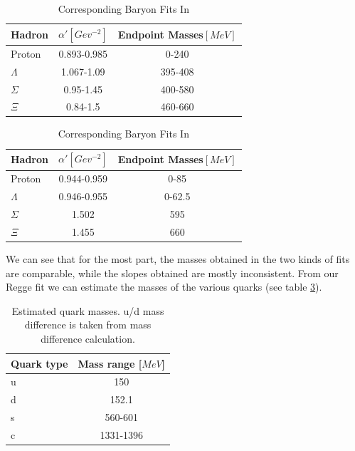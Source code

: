 \documentclass[11pt,a4paper]{article}
\begin{document}
\begin{table}
\centering
\begin{tabular}{|l|c|c|}
\hline
Hadron & $\alpha '\left[Gev^{-2}\right]$ & Endpoint Masses$\left[MeV\right]$ \\ \hline
Proton & 0.893-0.985 & 0-240 \\
$\Lambda$ & 1.067-1.09 & 395-408 \\
$\Sigma$ & 0.95-1.45 & 400-580 \\
$\Xi$  & 0.84-1.5 & 460-660 \\
\hline
\end{tabular}
\caption{Baryon Fits Summary Table. Endpoint mass is the same on both endpoints.}
\label{tab:baryonsum}

\centering
\begin{tabular}{|l|c|c|}
\hline
Hadron & $\alpha '\left[Gev^{-2}\right]$ & Endpoint Masses$\left[MeV\right]$ \\ \hline
Proton & 0.944-0.959 & 0-85 \\
$\Lambda$ & 0.946-0.955 & 0-62.5 \\
$\Sigma$ & 1.502 & 595 \\
$\Xi$  & 1.455 & 660 \\
\hline
\end{tabular}
\caption{Corresponding Baryon Fits In \cite{Sonnenschein15}}
\label{tab:baryonsumdorin}
\end{table}

We can see that for the most part, the masses obtained in the two kinds of fits are comparable, while the slopes obtained are mostly inconsistent. From our Regge fit we can estimate the masses of the various quarks  (see table \ref{tab:quarkmasses}).

\begin{table}
\centering
\begin{tabular}{|l|c|}
\hline
Quark type & Mass range [$MeV$] \\ \hline
u & 150\\ \hline
d & 152.1 \\ \hline
s & 560-601\\ \hline
c & 1331-1396\\ \hline
\end{tabular}
\caption{Estimated quark masses. u/d mass difference is taken from mass difference calculation.}
\label{tab:quarkmasses}
\end{table}
\end{document}
